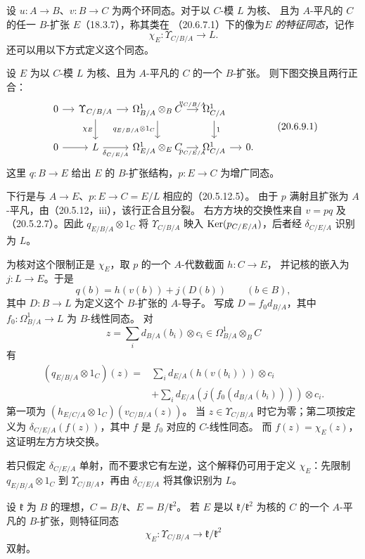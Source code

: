 设 $u:A\to B$、$v:B\to C$ 为两个环同态。对于以 $C$-模 $L$ 为核、
且为 $A$-平凡的 $C$ 的任一 $B$-扩张 $E$（18.3.7），称其类在
（20.6.7.1）下的像为\emph{$E$ 的特征同态}，记作
\[
 \chi_E:\Upsilon_{C/B/A}\longrightarrow L .
\]
还可以用以下方式定义这个同态。

设 $E$ 为以 $C$-模 $L$ 为核、且为 $A$-平凡的 $C$ 的一个 $B$-扩张。
则下图交换且两行正合：
\begin{equation}
\begin{tikzcd}[column sep=small]
0\arrow[r]&\Upsilon_{C/B/A}\arrow[r]\arrow[d,"\chi_E"']&
 \Omega^1_{B/A}\otimes_B C\arrow[r,"v_{C/B/A}"]\arrow[d,"q_{E/B/A}\otimes1_C"']&
 \Omega^1_{C/A}\arrow[d,"1"]&\\
0\arrow[r]&L\arrow[r,"\delta_{C/E/A}"']&
 \Omega^1_{E/A}\otimes_E C\arrow[r,"p_{C/E/A}"']&
 \Omega^1_{C/A}\arrow[r]&0 .
\end{tikzcd}
\tag{20.6.9.1}
\end{equation}
这里 $q:B\to E$ 给出 $E$ 的 $B$-扩张结构，$p:E\to C$ 为增广同态。

下行是与 $A\to E$、$p:E\to C=E/L$ 相应的（20.5.12.5）。
由于 $p$ 满射且扩张为 $A$-平凡，由（20.5.12，iii），该行正合且分裂。
右方方块的交换性来自 $v=pq$ 及（20.5.2.7）。因此
$q_{E/B/A}\otimes1_C$ 将 $\Upsilon_{C/B/A}$ 映入
$\operatorname{Ker}(p_{C/E/A})$，后者经 $\delta_{C/E/A}$ 识别为 $L$。

为核对这个限制正是 $\chi_E$，取 $p$ 的一个 $A$-代数截面 $h:C\to E$，
并记核的嵌入为 $j:L\to E$。于是
\[
 q(b)=h(v(b))+j(D(b))\qquad(b\in B),
\]
其中 $D:B\to L$ 为定义这个 $B$-扩张的 $A$-导子。
写成 $D=f_0d_{B/A}$，其中 $f_0:\Omega^1_{B/A}\to L$ 为 $B$-线性同态。
对
\[
 z=\sum_i d_{B/A}(b_i)\otimes c_i
 \in\Omega^1_{B/A}\otimes_B C
\]
有
\[
\begin{aligned}
(q_{E/B/A}\otimes1_C)(z)
={}&\sum_i d_{E/A}(h(v(b_i)))\otimes c_i\\
 &+\sum_i d_{E/A}(j(f_0(d_{B/A}(b_i))))\otimes c_i .
\end{aligned}
\]
第一项为 $(h_{E/C/A}\otimes1_C)(v_{C/B/A}(z))$。
当 $z\in\Upsilon_{C/B/A}$ 时它为零；第二项按定义为
$\delta_{C/E/A}(f(z))$，其中 $f$ 是 $f_0$ 对应的 $C$-线性同态。
而 $f(z)=\chi_E(z)$，这证明左方方块交换。

若只假定 $\delta_{C/E/A}$ 单射，而不要求它有左逆，这个解释仍可用于定义
$\chi_E$：先限制 $q_{E/B/A}\otimes1_C$ 到 $\Upsilon_{C/B/A}$，再由
$\delta_{C/E/A}$ 将其像识别为 $L$。

设 $\mathfrak k$ 为 $B$ 的理想，$C=B/\mathfrak k$、$E=B/\mathfrak k^2$。
若 $E$ 是以 $\mathfrak k/\mathfrak k^2$ 为核的 $C$ 的一个 $A$-平凡的
$B$-扩张，则特征同态
\[
 \chi_E:\Upsilon_{C/B/A}\longrightarrow\mathfrak k/\mathfrak k^2
\]
双射。

